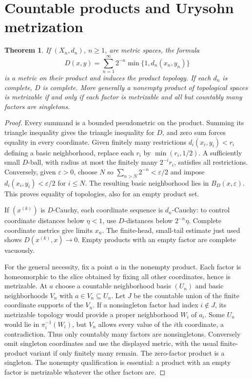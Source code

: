 \documentclass[11pt,oneside,openany]{book}
\newtheorem{theorem}{Theorem}[chapter]
\theoremstyle{definition}
\theoremstyle{remark}
\newcommand{\eps}{\varepsilon}
\begin{document}
\section{Countable products and Urysohn metrization}
\begin{theorem}\label{d10:10:product-metric}
If $(X_n,d_n)$, $n\geq1$, are metric spaces, the formula
\[
 D(x,y)=\sum_{n=1}^{\infty}2^{-n}\min\{1,d_n(x_n,y_n)\}
\]
is a metric on their product and induces the product topology. If each $d_n$ is complete, $D$ is complete. More generally a nonempty product of topological spaces is metrizable if and only if each factor is metrizable and all but countably many factors are singletons.
\end{theorem}
\begin{proof}
Every summand is a bounded pseudometric on the product. Summing its triangle inequality gives the triangle inequality for $D$, and zero sum forces equality in every coordinate. Given finitely many restrictions $d_i(x_i,y_i)<r_i$ defining a basic neighborhood, replace each $r_i$ by $\min(r_i,1/2)$. A sufficiently small $D$-ball, with radius at most the finitely many $2^{-i}r_i$, satisfies all restrictions. Conversely, given $\eps>0$, choose $N$ so $\sum_{n>N}2^{-n}<\eps/2$ and impose $d_i(x_i,y_i)<\eps/2$ for $i\leq N$. The resulting basic neighborhood lies in $B_D(x,\eps)$. This proves equality of topologies, also for an empty product set.

If $(x^{(k)})$ is $D$-Cauchy, each coordinate sequence is $d_n$-Cauchy: to control coordinate distances below $\eta<1$, use $D$-distances below $2^{-n}\eta$. Complete coordinate metrics give limits $x_n$. The finite-head, small-tail estimate just used shows $D(x^{(k)},x)\to0$. Empty products with an empty factor are complete vacuously.

For the general necessity, fix a point $a$ in the nonempty product. Each factor is homeomorphic to the slice obtained by fixing all other coordinates, hence is metrizable. At $a$ choose a countable neighborhood basis $(U_n)$ and basic neighborhoods $V_n$ with $a\in V_n\subseteq U_n$. Let $J$ be the countable union of the finite coordinate supports of the $V_n$. If a nonsingleton factor had index $i\notin J$, its metrizable topology would provide a proper neighborhood $W_i$ of $a_i$. Some $U_n$ would lie in $\pi_i^{-1}(W_i)$, but $V_n$ allows every value of the $i$th coordinate, a contradiction. Thus only countably many factors are nonsingletons. Conversely omit singleton coordinates and use the displayed metric, with the usual finite-product variant if only finitely many remain. The zero-factor product is a singleton. The nonempty qualification is essential: a product with an empty factor is metrizable whatever the other factors are.
\end{proof}
\end{document}
